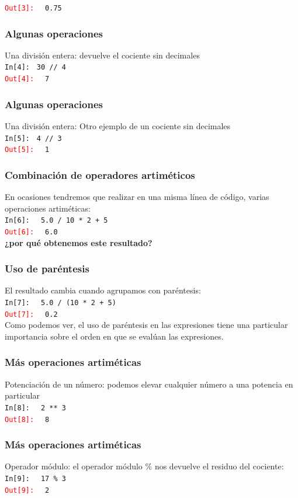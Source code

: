 {\begin{frame}[fragile]
\pause
\textcolor{red}{\texttt{Out[3]: }} \verb| 0.75|
\end{frame}
\begin{frame}[fragile]
\frametitle{Algunas operaciones}
Una división entera: devuelve el cociente sin decimales
\\
\bigskip
\textcolor{ao}{\texttt{In[4]: }} \verb|30 // 4| \\
\pause
\textcolor{red}{\texttt{Out[4]: }} \verb| 7|
\end{frame}
\begin{frame}[fragile]
\frametitle{Algunas operaciones}
Una división entera: Otro ejemplo de un cociente sin decimales
\\
\bigskip
\textcolor{ao}{\texttt{In[5]: }} \verb|4 // 3| \\
\pause
\textcolor{red}{\texttt{Out[5]: }} \verb| 1|
\end{frame}
\begin{frame}[fragile]
\frametitle{Combinación de operadores artiméticos}
En ocasiones tendremos que realizar en una misma línea de código, varias operaciones artiméticas:
\\
\bigskip
\textcolor{ao}{\texttt{In[6]: }} \verb| 5.0 / 10 * 2 + 5| \\
\pause
\textcolor{red}{\texttt{Out[6]: }} \verb| 6.0|
\pause
\\
\bigskip
\textbf{¿por qué obtenemos este resultado?}
\end{frame}
\begin{frame}[fragile]
\frametitle{Uso de paréntesis}
El resultado cambia cuando agrupamos con paréntesis:
\\
\bigskip
\textcolor{ao}{\texttt{In[7]: }} \verb| 5.0 / (10 * 2 + 5)| \\
\pause
\textcolor{red}{\texttt{Out[7]: }} \verb| 0.2|
\pause
\\
\bigskip
Como podemos ver, el uso de paréntesis en las expresiones tiene una particular importancia sobre el orden en que se evalúan las expresiones.
\end{frame}
\begin{frame}[fragile]
\frametitle{Más operaciones artiméticas}
Potenciación de un número: podemos elevar cualquier número a una potencia en particular
\\
\bigskip
\textcolor{ao}{\texttt{In[8]: }}  \verb| 2 ** 3| \\
\pause
\textcolor{red}{\texttt{Out[8]: }} \verb| 8|
\end{frame}
\begin{frame}[fragile]
\frametitle{Más operaciones artiméticas}
Operador módulo: el operador módulo $\%$ nos devuelve el residuo del cociente:
\\
\bigskip
\textcolor{ao}{\texttt{In[9]: }} \verb| 17 % 3| \\
\pause
\textcolor{red}{\texttt{Out[9]: }} \verb| 2|
\end{frame}
}
